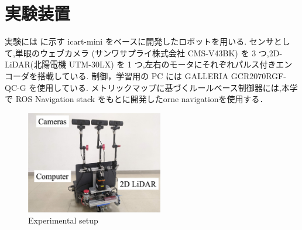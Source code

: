 \section{実験装置}
実験には  に示す icart-mini\cite{icart} をベースに開発したロボットを用いる.
センサとして,単眼のウェブカメラ (サンワサプライ株式会社 CMS-V43BK) を 3 つ,2D-LiDAR(北陽電機 UTM-30LX) を 1 つ,左右のモータにそれぞれパルス付きエンコーダを搭載している.
制御，学習用の PC には GALLERIA GCR2070RGF-QC-G を使用している.
メトリックマップに基づくルールベース制御器には,本学で ROS Navigation stack をもとに開発したorne navigation\cite{orne_nav}を使用する．

\begin{figure}[htbp]
    \centering
     \includegraphics[width=60mm]{images/pdf/haruyama/gamma.pdf}
     \caption{Experimental setup}
     \label{fig:gamma}
\end{figure}